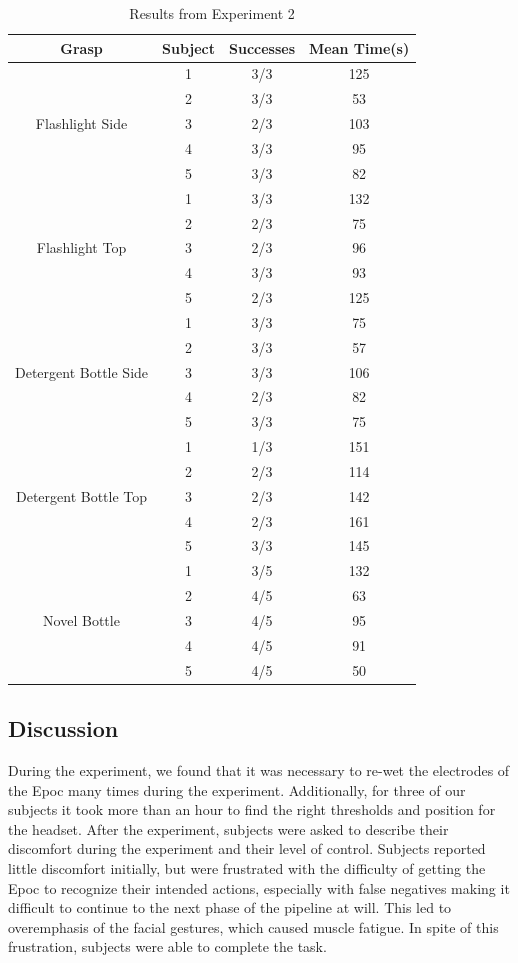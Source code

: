 \begin{table}
\centering
\begin{tabular}{ | c | c | c | c | }
\hline
Grasp & Subject & Successes & Mean Time(s) \\ \hline \hline
\multirow{5}{*}{Flashlight Side} & 1 & 3/3 & 125 \\ 
& 2 & 3/3 & 53 \\ 
& 3 & 2/3 & 103 \\
& 4 & 3/3 & 95 \\
& 5 & 3/3 & 82 \\ \hline
\multirow{5}{*}{Flashlight Top} & 1 & 3/3 & 132 \\ 
& 2 & 2/3 & 75 \\ 
& 3 & 2/3 & 96 \\
& 4 & 3/3 & 93 \\
& 5 & 2/3 & 125 \\ \hline
\multirow{5}{*}{Detergent Bottle Side} & 1 & 3/3 & 75 \\ 
& 2 & 3/3 & 57 \\ 
& 3 & 3/3 & 106 \\
& 4 & 2/3 & 82 \\
& 5 & 3/3 & 75 \\ \hline
\multirow{5}{*}{Detergent Bottle Top} & 1 & 1/3 & 151 \\ 
& 2 & 2/3 & 114 \\ 
& 3 & 2/3 & 142\\
& 4 & 2/3 & 161 \\
& 5 & 3/3 & 145 \\ \hline
\multirow{5}{*}{Novel Bottle} & 1 & 3/5 & 132 \\
&2 & 4/5 & 63 \\
&3 & 4/5 & 95 \\
&4 & 4/5 & 91 \\
&5 & 4/5 & 50 \\ \hline 
\end{tabular}
\caption{Results from Experiment 2}
\label{tab:results_2}
\end{table}

\subsection{Discussion}
During the experiment, we found that it was necessary to re-wet the electrodes of the Epoc many times during the experiment. Additionally, for three of our subjects it took more than an hour to find the right thresholds and position for the headset. After the experiment, subjects were asked to describe their discomfort during the experiment and their level of control. Subjects reported little discomfort initially, but were frustrated with the difficulty of getting the Epoc to recognize their intended actions, especially with false negatives making it difficult to continue to the next phase of the pipeline at will. This led to overemphasis of the facial gestures, which caused muscle fatigue. In spite of this frustration, subjects were able to complete the task. 

